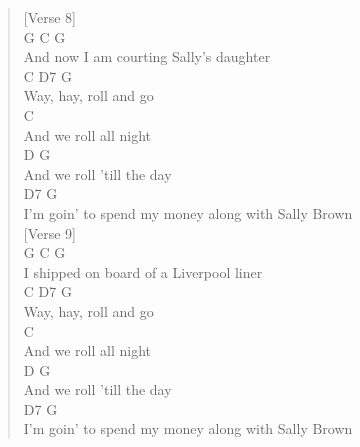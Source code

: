 \documentclass[11pt]{article}
\begin{document}
\begin{verse}
\vspace*{1em}
[Verse 8]\\
\vspace*{1em}
G                       C        G\\
And now I am courting Sally's daughter\\
\hspace*{5em}C     D7      G\\
Way, hay, roll and go\\
\hspace*{18em}C\\
And we roll all night\\
\hspace*{8em}D              G\\
And we roll 'till the day\\
\hspace*{41em}D7    G\\
I'm goin' to spend my money along with Sally Brown\\
\vspace*{1em}
\vspace*{1em}
[Verse 9]\\
\vspace*{1em}
G                          C        G\\
I shipped on board of a Liverpool liner\\
\hspace*{5em}C     D7      G\\
Way, hay, roll and go\\
\hspace*{18em}C\\
And we roll all night\\
\hspace*{8em}D              G\\
And we roll 'till the day\\
\hspace*{41em}D7    G\\
I'm goin' to spend my money along with Sally Brown\\
\end{verse}
\clearpage
\end{document}
